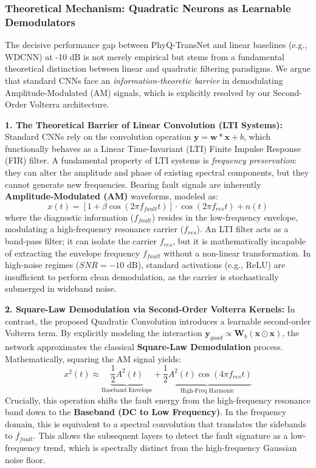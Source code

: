 \documentclass[5p,times,twocolumn]{elsarticle}
\begin{document}
\subsubsection{Theoretical Mechanism: Quadratic Neurons as Learnable Demodulators}
The decisive performance gap between PhyQ-TransNet and linear baselines (e.g., WDCNN) at -10 dB is not merely empirical but stems from a fundamental theoretical distinction between linear and quadratic filtering paradigms. We argue that standard CNNs face an \textit{information-theoretic barrier} in demodulating Amplitude-Modulated (AM) signals, which is explicitly resolved by our Second-Order Volterra architecture.

\textbf{1. The Theoretical Barrier of Linear Convolution (LTI Systems):}
Standard CNNs rely on the convolution operation $\mathbf{y} = \mathbf{w} * \mathbf{x} + b$, which functionally behaves as a Linear Time-Invariant (LTI) Finite Impulse Response (FIR) filter. A fundamental property of LTI systems is \textit{frequency preservation}: they can alter the amplitude and phase of existing spectral components, but they cannot generate new frequencies.
Bearing fault signals are inherently \textbf{Amplitude-Modulated (AM)} waveforms, modeled as:
\begin{equation}
    x(t) = [1 + \beta \cos(2\pi f_{fault} t)] \cdot \cos(2\pi f_{res} t) + n(t)
\end{equation}
where the diagnostic information ($f_{fault}$) resides in the low-frequency envelope, modulating a high-frequency resonance carrier ($f_{res}$). An LTI filter acts as a band-pass filter; it can isolate the carrier $f_{res}$, but it is mathematically incapable of extracting the envelope frequency $f_{fault}$ without a non-linear transformation. In high-noise regimes ($SNR = -10 \text{ dB}$), standard activations (e.g., ReLU) are insufficient to perform clean demodulation, as the carrier is stochastically submerged in wideband noise.

\textbf{2. Square-Law Demodulation via Second-Order Volterra Kernels:}
In contrast, the proposed Quadratic Convolution introduces a learnable second-order Volterra term. By explicitly modeling the interaction $\mathbf{y}_{quad} \propto \mathbf{W}_b (\mathbf{x} \odot \mathbf{x})$, the network approximates the classical \textbf{Square-Law Demodulation} process.
Mathematically, squaring the AM signal yields:
\begin{equation}
    x^2(t) \approx \underbrace{\frac{1}{2} A^2(t)}_{\text{Baseband Envelope}} + \underbrace{\frac{1}{2} A^2(t) \cos(4\pi f_{res} t)}_{\text{High-Freq Harmonic}}
\end{equation}
Crucially, this operation shifts the fault energy from the high-frequency resonance band down to the \textbf{Baseband (DC to Low Frequency)}. In the frequency domain, this is equivalent to a spectral convolution that translates the sidebands to $f_{fault}$. This allows the subsequent layers to detect the fault signature as a low-frequency trend, which is spectrally distinct from the high-frequency Gaussian noise floor.
\end{document}
